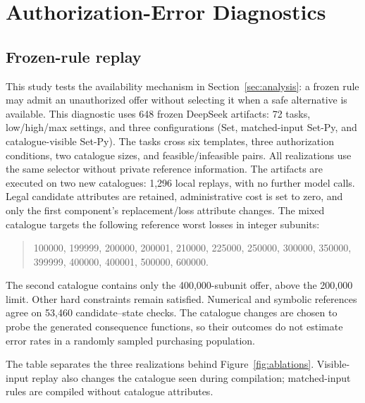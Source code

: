 \section{Authorization-Error Diagnostics}
\label{app:permissionaudit}
\subsection{Frozen-rule replay}
This study tests the availability mechanism in Section~\ref{sec:analysis}: a frozen rule may admit an unauthorized offer without selecting it when a safe alternative is available.
This diagnostic uses 648 frozen DeepSeek artifacts: 72 tasks, low/high/max settings, and three configurations (Set, matched-input Set-Py, and catalogue-visible Set-Py). The tasks cross six templates, three authorization conditions, two catalogue sizes, and feasible/infeasible pairs. All realizations use the same selector without private reference information. The artifacts are executed on two new catalogues: 1,296 local replays, with no further model calls. Legal candidate attributes are retained, administrative cost is set to zero, and only the first component's replacement/loss attribute changes. The mixed catalogue targets the following reference worst losses in integer subunits:
\begin{quote}\small
100000, 199999, 200000, 200001, 210000, 225000, 250000, 300000, 350000, 399999, 400000, 400001, 500000, 600000.
\end{quote}
The second catalogue contains only the 400,000-subunit offer, above the 200,000 limit. Other hard constraints remain satisfied. Numerical and symbolic references agree on 53,460 candidate--state checks. The catalogue changes are chosen to probe the generated consequence functions, so their outcomes do not estimate error rates in a randomly sampled purchasing population.

\begin{table}[t]
\centering\small\setlength{\tabcolsep}{5pt}

\caption{DeepSeek frozen-rule replay counts for low, high, and max settings: 72 artifacts per row and two catalogues per artifact. Unsafe domains and choices are counted separately; invalid executions are not credited as safe. The primary DeepSeek plot pools the three realizations within each configuration.}
\label{tab:replay}
\end{table}

The table separates the three realizations behind Figure~\ref{fig:ablations}. Visible-input replay also changes the catalogue seen during compilation; matched-input rules are compiled without catalogue attributes.

